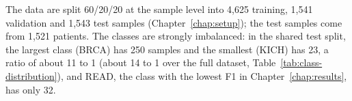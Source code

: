 The data are split 60/20/20 at the sample level into 4{,}625 training, 1{,}541 validation and
1{,}543 test samples (Chapter~\ref{chap:setup}); the test samples come from 1{,}521 patients.
The classes are strongly imbalanced: in the shared test split, the largest class (BRCA) has 250
samples and the smallest (KICH) has 23, a ratio of about 11 to 1 (about 14 to 1 over the full
dataset, Table~\ref{tab:class-distribution}), and READ, the class with the lowest F1 in
Chapter~\ref{chap:results}, has only 32.
